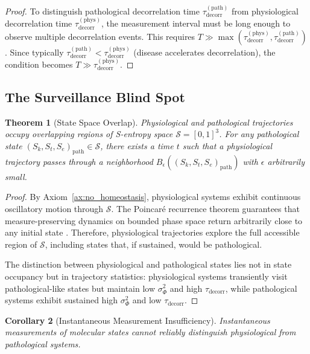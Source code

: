 \documentclass[11pt,twocolumn,a4paper]{article}
\newtheorem{theorem}{Theorem}[section]
\newtheorem{corollary}[theorem]{Corollary}
\theoremstyle{definition}
\theoremstyle{remark}
\newcommand{\Sspace}{\mathcal{S}}
\newcommand{\Scoord}{(\Sk,\St,\Se)}
\newcommand{\Sk}{S_k}
\newcommand{\St}{S_t}
\newcommand{\Se}{S_e}
\newcommand{\taudecorr}{\tau_{\mathrm{decorr}}}
\begin{document}
\begin{proof}
To distinguish pathological decorrelation time $\taudecorr^{\mathrm{(path)}}$ from physiological decorrelation time $\taudecorr^{\mathrm{(phys)}}$, the measurement interval must be long enough to observe multiple decorrelation events. This requires $T \gg \max(\taudecorr^{\mathrm{(phys)}}, \taudecorr^{\mathrm{(path)}})$. Since typically $\taudecorr^{\mathrm{(path)}} < \taudecorr^{\mathrm{(phys)}}$ (disease accelerates decorrelation), the condition becomes $T \gg \taudecorr^{\mathrm{(phys)}}$.
\end{proof}

\subsection{The Surveillance Blind Spot}

\begin{theorem}[State Space Overlap]
\label{thm:state_space_overlap}
Physiological and pathological trajectories occupy overlapping regions of S-entropy space $\Sspace = [0,1]^3$. For any pathological state $\Scoord_{\mathrm{path}} \in \Sspace$, there exists a time $t$ such that a physiological trajectory passes through a neighborhood $B_\epsilon(\Scoord_{\mathrm{path}})$ with $\epsilon$ arbitrarily small.
\end{theorem}

\begin{proof}
By Axiom~\ref{ax:no_homeostasis}, physiological systems exhibit continuous oscillatory motion through $\Sspace$. The Poincaré recurrence theorem guarantees that measure-preserving dynamics on bounded phase space return arbitrarily close to any initial state \citep{poincare1890probleme,katok1995introduction}. Therefore, physiological trajectories explore the full accessible region of $\Sspace$, including states that, if sustained, would be pathological.

The distinction between physiological and pathological states lies not in state occupancy but in trajectory statistics: physiological systems transiently visit pathological-like states but maintain low $\sigma_\Phi^2$ and high $\taudecorr$, while pathological systems exhibit sustained high $\sigma_\Phi^2$ and low $\taudecorr$.
\end{proof}

\begin{corollary}[Instantaneous Measurement Insufficiency]
\label{cor:instantaneous_insufficient}
Instantaneous measurements of molecular states cannot reliably distinguish physiological from pathological systems.
\end{corollary}
\end{document}
